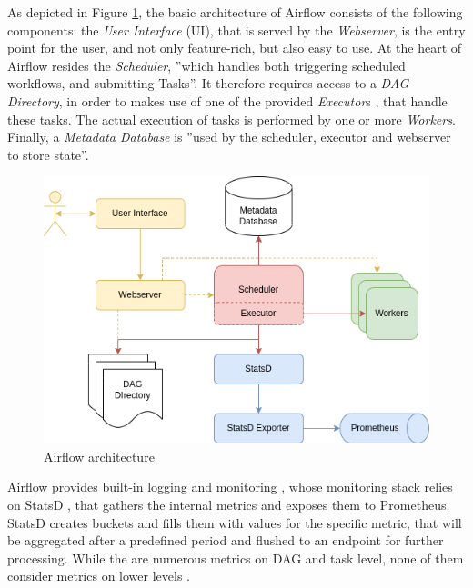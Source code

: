 \documentclass[a4paper,journal]{IEEEtran}
\begin{document}
	As depicted in Figure \ref{fig:aiflow:arch}, the basic architecture of Airflow consists of the following components: the \textit{User Interface} (UI), that is served by the \textit{Webserver}, is the entry point for the user, and not only feature-rich, but also easy to use. At the heart of Airflow resides the \textit{Scheduler}, ''which handles both triggering scheduled workflows, and submitting Tasks''\cite{airflowArchitecture}. It therefore requires access to a \textit{DAG Directory}, in order to makes use of one of the provided \textit{Executor}s \cite{airflowExecutor}, that handle these tasks. The actual execution of tasks is performed by one or more \textit{Workers}. Finally, a \textit{Metadata Database} is ''used by the scheduler, executor and webserver to store state''\cite{airflowArchitecture}.
	\begin{figure}[h]
		\includegraphics[width=\linewidth]{images/airflow-architecture.png}
		\caption{Airflow architecture}
		\label{fig:aiflow:arch}
	\end{figure}
	
	Airflow provides built-in logging and monitoring \cite{airflowMonitoring}, whose monitoring stack relies on StatsD \cite{statsd}, that gathers the internal metrics and exposes them to Prometheus. StatsD creates buckets and fills them with values for the specific metric, that will be aggregated after a predefined period and flushed to an endpoint for further processing. While the are numerous metrics on DAG and task level, none of them consider metrics on lower levels \cite{airflowMetrics}.
	
\end{document}
